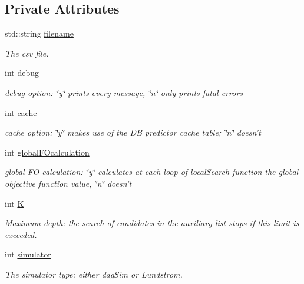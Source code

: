 \subsection*{Private Attributes}
\begin{DoxyCompactItemize}
\item 
std\-::string \hyperlink{classoptJrParameters_a62fe03fe9f9484b54235a0dbe4c09736}{filename}
\begin{DoxyCompactList}\small\item\em The csv file. \end{DoxyCompactList}\item 
int \hyperlink{classoptJrParameters_aeac321db6ab6babd047c06696a260e90}{debug}
\begin{DoxyCompactList}\small\item\em debug option\-: \char`\"{}y\char`\"{} prints every message, \char`\"{}n\char`\"{} only prints fatal errors \end{DoxyCompactList}\item 
int \hyperlink{classoptJrParameters_a62b46c4db0655e8aea32e2929996d626}{cache}
\begin{DoxyCompactList}\small\item\em cache option\-: \char`\"{}y\char`\"{} makes use of the D\-B predictor cache table; \char`\"{}n\char`\"{} doesn't \end{DoxyCompactList}\item 
int \hyperlink{classoptJrParameters_ad00a4d00bc8b65f4323a1bd1383c632b}{global\-F\-Ocalculation}
\begin{DoxyCompactList}\small\item\em global F\-O calculation\-: \char`\"{}y\char`\"{} calculates at each loop of local\-Search function the global objective function value, \char`\"{}n\char`\"{} doesn't \end{DoxyCompactList}\item 
int \hyperlink{classoptJrParameters_a8943dcfa48e368831ec28c9d1f5a953d}{K}
\begin{DoxyCompactList}\small\item\em Maximum depth\-: the search of candidates in the auxiliary list stops if this limit is exceeded. \end{DoxyCompactList}\item 
int \hyperlink{classoptJrParameters_a8bb0a0aa1f458ff3973fbe43552e1cd5}{simulator}
\begin{DoxyCompactList}\small\item\em The simulator type\-: either dag\-Sim or Lundstrom. \end{DoxyCompactList}\item 

\end{DoxyCompactItemize}
